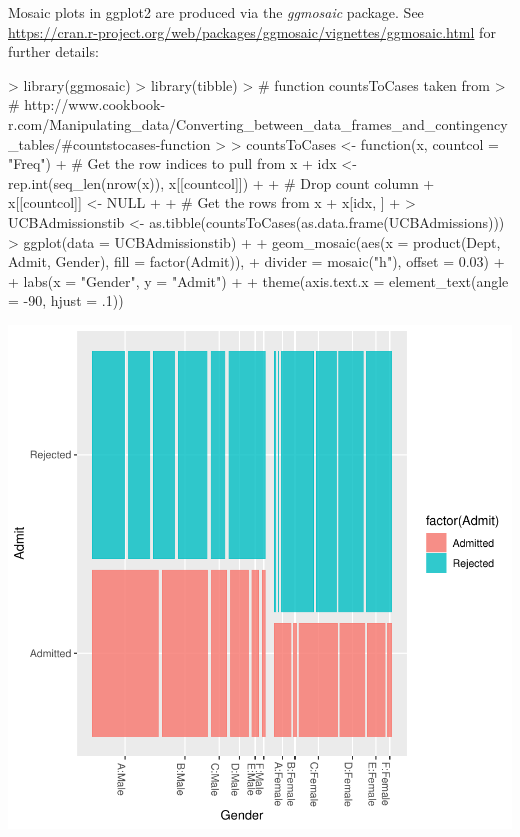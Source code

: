 \documentclass[12pt,letterpaper,final]{article}
\begin{document}
Mosaic plots in ggplot2 are produced via the {\it ggmosaic} package.
See \url{https://cran.r-project.org/web/packages/ggmosaic/vignettes/ggmosaic.html}
for further details:


\begin{Schunk}
\begin{Sinput}
> library(ggmosaic)
> library(tibble)
> # function countsToCases taken from
> # http://www.cookbook-r.com/Manipulating_data/Converting_between_data_frames_and_contingency_tables/#countstocases-function
> 
> countsToCases <- function(x, countcol = "Freq") {
+     # Get the row indices to pull from x
+     idx <- rep.int(seq_len(nrow(x)), x[[countcol]])
+ 
+     # Drop count column
+     x[[countcol]] <- NULL
+ 
+     # Get the rows from x
+     x[idx, ]
+ }
> UCBAdmissionstib <- as.tibble(countsToCases(as.data.frame(UCBAdmissions)))
> ggplot(data = UCBAdmissionstib) +
+    geom_mosaic(aes(x = product(Dept, Admit, Gender), fill = factor(Admit)), 
+                divider = mosaic("h"), offset = 0.03) +
+   labs(x = "Gender", y = "Admit") +
+   theme(axis.text.x = element_text(angle = -90, hjust = .1))
\end{Sinput}
\end{Schunk}
\includegraphics{lect_main-045}
\end{document}
